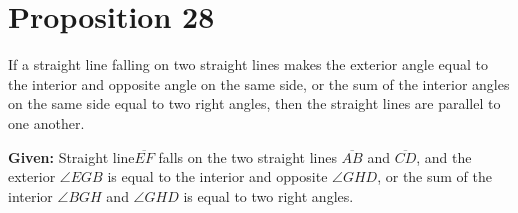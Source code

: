 
\section*{Proposition 28}

\begin{thm}
If a straight line falling on two straight lines makes the exterior angle equal to the interior and opposite angle on the same side, or the sum of the interior angles on the same side equal to two right angles, then the straight lines are parallel to one another.
\end{thm}

\textbf{Given:} Straight line$ \overline{EF}$ falls on the two straight lines $\overline{AB}$ and $\overline{CD}$, and the exterior  $\angle{EGB}$ is equal to the interior and opposite $\angle{GHD}$, or the sum of the interior $\angle{BGH}$ and $\angle{GHD}$ is equal to two right angles.


